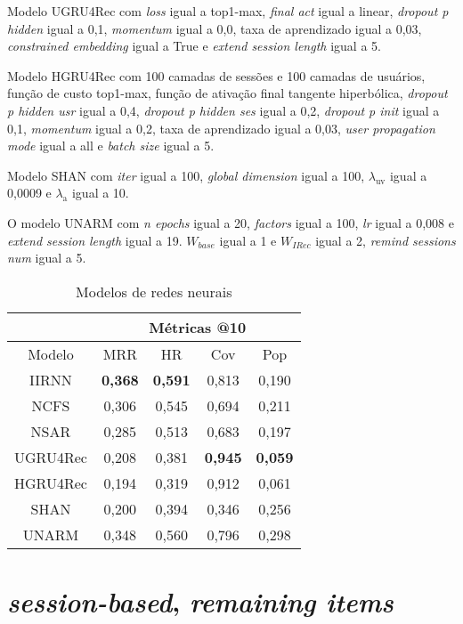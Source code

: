 Modelo UGRU4Rec com \textit{loss} igual a top1-max, \textit{final act} igual a
linear, \textit{dropout p hidden} igual a 0,1, \textit{momentum} igual a 0,0,
taxa de aprendizado igual a 0,03, \textit{constrained embedding} igual a True e
\textit{extend session length} igual a 5.

Modelo HGRU4Rec com 100 camadas de sessões e 100 camadas de usuários, função de
custo top1-max, função de ativação final tangente hiperbólica,
\textit{dropout p hidden usr} igual a 0,4, \textit{dropout p hidden ses} igual a
0,2, \textit{dropout p init} igual a 0,1, \textit{momentum} igual a 0,2, taxa de
aprendizado igual a 0,03, \textit{user propagation mode} igual a all e
\textit{batch size} igual a 5.


Modelo SHAN com \textit{iter} igual a 100, \textit{global dimension} igual a
100, $\lambda_{\text{uv}}$ igual a 0,0009 e $\lambda_{\text{a}}$ igual a 10.

O modelo UNARM com \textit{n epochs} igual a 20, \textit{factors} igual a 100,
\textit{lr} igual a 0,008 e \textit{extend session length} igual a 19. $W_{base}$
igual a 1 e $W_{IRec}$ igual a 2, \textit{remind sessions num} igual a 5.

\begin{table}[htbp]
  \centering
  \begin{tabular}{|c|c|c|c|c|}
    \hline
      \multicolumn{1}{|c|}{} & \multicolumn{4}{c|}{Métricas @10} \\
      \hline
      Modelo & MRR & HR & Cov & Pop \\
      \hline
      IIRNN & \textbf{0,368} & \textbf{0,591} & 0,813 & 0,190 \\
      \hline
      NCFS & 0,306 & 0,545 & 0,694 & 0,211 \\
      \hline
      NSAR & 0,285 & 0,513 & 0,683 & 0,197 \\
      \hline
      UGRU4Rec & 0,208 & 0,381 & \textbf{0,945} & \textbf{0,059} \\
      \hline
      HGRU4Rec & 0,194 & 0,319 & 0,912 & 0,061 \\ 
      \hline
      SHAN & 0,200 & 0,394 & 0,346 & 0,256 \\
      \hline
      UNARM & 0,348 & 0,560 & 0,796 & 0,298 \\
      \hline
      \end{tabular}
      \caption{Modelos de redes neurais}
      \label{tab:nn_models_aware}
\end{table}


\section{\textit{session-based}, \textit{remaining items}}

